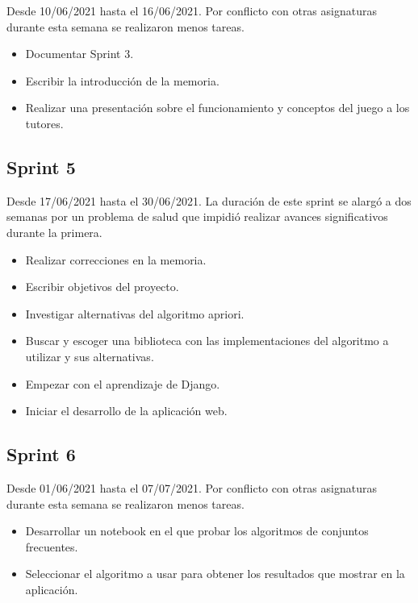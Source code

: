 Desde 10/06/2021 hasta el 16/06/2021. Por conflicto con otras asignaturas durante esta semana se realizaron menos tareas.

\begin{itemize}
    \item Documentar Sprint 3.
    \item Escribir la introducción de la memoria.
    \item Realizar una presentación sobre el funcionamiento y conceptos del juego a los tutores.
\end{itemize}

\subsection{Sprint 5}

Desde 17/06/2021 hasta el 30/06/2021. La duración de este sprint se alargó a dos semanas por un problema de salud que impidió realizar avances significativos durante la primera.

\begin{itemize}
    \item Realizar correcciones en la memoria.
    \item Escribir objetivos del proyecto.
    \item Investigar alternativas del algoritmo apriori.
    \item Buscar y escoger una biblioteca con las implementaciones del algoritmo a utilizar y sus alternativas.
    \item Empezar con el aprendizaje de Django.
    \item Iniciar el desarrollo de la aplicación web.
\end{itemize}

\subsection{Sprint 6}

Desde 01/06/2021 hasta el 07/07/2021. Por conflicto con otras asignaturas durante esta semana se realizaron menos tareas.

\begin{itemize}
    \item Desarrollar un notebook en el que probar los algoritmos de conjuntos frecuentes.
    \item Seleccionar el algoritmo a usar para obtener los resultados que mostrar en la aplicación.
\end{itemize}

